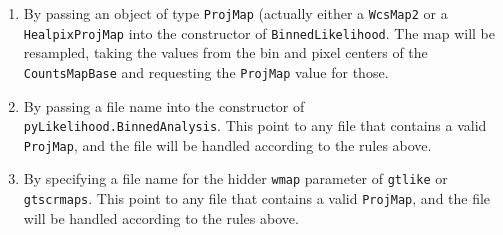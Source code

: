 \documentclass[preprint]{aastex}
\begin{document}
\begin{enumerate}
\item{By passing an object of type {\tt ProjMap} (actually either a
    {\tt WcsMap2} or a {\tt HealpixProjMap} into the constructor of
    {\tt BinnedLikelihood}.  The map will be resampled, taking the values
    from the bin and pixel centers of the {\tt CountsMapBase} and
    requesting the {\tt ProjMap} value for those.}    
\item{By passing a file name into the constructor of {\tt pyLikelihood.BinnedAnalysis}.
    This point to any file that contains a valid {\tt ProjMap}, and the
    file will be handled according to the rules above.}
\item{By specifying a file name for the hidder {\tt wmap} parameter of {\tt gtlike} or {\tt gtscrmaps}.
    This point to any file that contains a valid {\tt ProjMap}, and the
    file will be handled according to the rules above.}
\end{enumerate}
\end{document}
